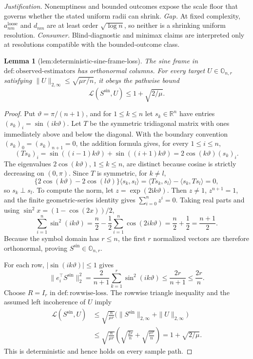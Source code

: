 \documentclass{article}
\newtheorem{lemma}{Lemma}
\begin{document}
\par\smallskip\noindent \textit{Justification.} Nonemptiness and bounded outcomes expose the scale floor that governs whether the stated uniform radii can shrink. \textit{Gap.} At fixed complexity, \(a^{\mathrm{loose}}_{nm}\) and \(d_{nm}\) are at least order \(\sqrt{\log n}\), so neither is a shrinking uniform resolution. \textit{Consumer.} Blind-diagnostic and minimax claims are interpreted only at resolutions compatible with the bounded-outcome class.

\begin{lemma}[lem:deterministic-sine-frame-loss]\label{lem:deterministic-sine-frame-loss}
The sine frame in \(\mathrm{def:observed\mbox{-}estimators}\) has orthonormal columns.  For every target \(U\in\mathbb O_{n,r}\) satisfying \(\|U\|_{2,\infty}\le\sqrt{\mu r/n}\), it obeys the pathwise bound
\[
 \mathcal L(S^{\mathrm{sin}},U)\le1+\sqrt{2/\mu}.
\]
\end{lemma}
\begin{proof}
Put \(\vartheta=\pi/(n+1)\), and for \(1\le k\le n\) let \(s_k\in\mathbb R^n\) have entries \((s_k)_i=\sin(ik\vartheta)\).  Let \(T\) be the symmetric tridiagonal matrix with ones immediately above and below the diagonal.  With the boundary convention \((s_k)_0=(s_k)_{n+1}=0\), the addition formula gives, for every \(1\le i\le n\),
\[
 (Ts_k)_i=\sin((i-1)k\vartheta)+\sin((i+1)k\vartheta)
 =2\cos(k\vartheta)(s_k)_i.
\]
The eigenvalues \(2\cos(k\vartheta)\), \(1\le k\le n\), are distinct because cosine is strictly decreasing on \((0,\pi)\).  Since \(T\) is symmetric, for \(k\ne l\),
\[
 \{2\cos(k\vartheta)-2\cos(l\vartheta)\}\langle s_k,s_l\rangle
 =\langle Ts_k,s_l\rangle-\langle s_k,Ts_l\rangle=0,
\]
so \(s_k\perp s_l\).  To compute the norm, let \(z=\exp(2\mathrm i k\vartheta)\).  Then \(z\ne1\), \(z^{n+1}=1\), and the finite geometric-series identity gives \(\sum_{i=0}^nz^i=0\).  Taking real parts and using \(\sin^2x=(1-\cos(2x))/2\),
\[
 \sum_{i=1}^n\sin^2(ik\vartheta)
 =\frac n2-\frac12\sum_{i=1}^n\cos(2ik\vartheta)
 =\frac n2+\frac12=\frac{n+1}{2}.
\]
Because the symbol domain has \(r\le n\), the first \(r\) normalized vectors are therefore orthonormal, proving \(S^{\mathrm{sin}}\in\mathbb O_{n,r}\).

For each row, \(|\sin(ik\vartheta)|\le1\) gives
\[
 \|e_i^\top S^{\mathrm{sin}}\|_2^2
 =\frac2{n+1}\sum_{k=1}^r\sin^2(ik\vartheta)
 \le\frac{2r}{n+1}\le\frac{2r}{n}.
\]
Choose \(R=I_r\) in \(\mathrm{def:rowwise\mbox{-}loss}\).  The rowwise triangle inequality and the assumed left incoherence of \(U\) imply
\[
 \begin{aligned}
 \mathcal L(S^{\mathrm{sin}},U)
 &\le\sqrt{\frac n{\mu r}}
 \bigl(\|S^{\mathrm{sin}}\|_{2,\infty}+\|U\|_{2,\infty}\bigr)\\
 &\le\sqrt{\frac n{\mu r}}
 \left(\sqrt{\frac{2r}{n}}+\sqrt{\frac{\mu r}{n}}\right)
 =1+\sqrt{2/\mu}.
\end{aligned}
\]
This is deterministic and hence holds on every sample path.
\end{proof}
\end{document}
